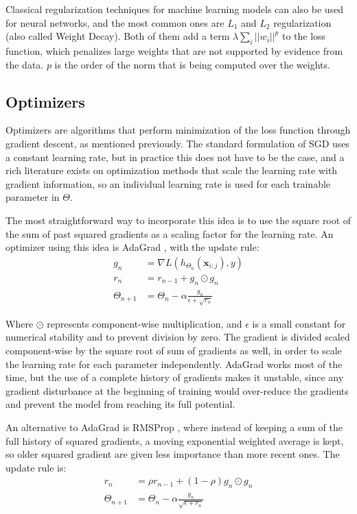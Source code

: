 Classical regularization techniques for machine learning models can also be used for neural networks, and the most common ones are $L_1$ and $L_2$ regularization  (also called Weight Decay). Both of them add a term $\lambda \sum_i ||w_i||^p$ to the loss function, which penalizes large weights that are not supported by evidence from the data. $p$ is the order of the norm that is being computed over the weights.

\subsection{Optimizers}

Optimizers are algorithms that perform minimization of the loss function through gradient descent, as mentioned previously. The standard formulation of SGD uses a constant learning rate, but in practice this does not have to be the case, and a rich literature\cite{ruder2016overview} exists on optimization methods that scale the learning rate with gradient information, so an individual learning rate is used for each trainable parameter in $\Theta$.

The most straightforward way to incorporate this idea is to use the square root of the sum of past squared gradients as a scaling factor for the learning rate. An optimizer using this idea is AdaGrad \cite{duchi2011adaptive}, with the update rule:
\vspace*{1em}
\begin{align}
    g_n &= \nabla L(h_{\Theta_{n}}(\textbf{x}_{i:j}), y)\nonumber \\
    r_n &= r_{n-1} + g_n \odot g_n\nonumber\\
    \Theta_{n+1} &= \Theta_{n} - \alpha \frac{g_n}{\epsilon + \sqrt{r_n}}
    \label{background:AdaGrad}
\end{align}

Where $\odot$ represents component-wise multiplication, and $\epsilon$ is a small constant for numerical stability and to prevent division by zero. The gradient is divided scaled component-wise by the square root of sum of gradients as well, in order to scale the learning rate for each parameter independently. AdaGrad works most of the time, but the use of a complete history of gradients makes it unstable, since any gradient disturbance at the beginning of training would over-reduce the gradients and prevent the model from reaching its full potential.

An alternative to AdaGrad is RMSProp \cite{tieleman2012lecture}, where instead of keeping a sum of the full history of squared gradients, a moving exponential weighted average is kept, so older squared gradient are given less importance than more recent ones. The update rule is:
\vspace*{1em}
\begin{align}
    r_n &= \rho r_{n-1} + (1 - \rho) g_n \odot g_n\nonumber\\
    \Theta_{n+1} &= \Theta_{n} - \alpha \frac{g_n}{\sqrt{\epsilon + r_n}}
    \label{background:RMSProp}
\end{align}

